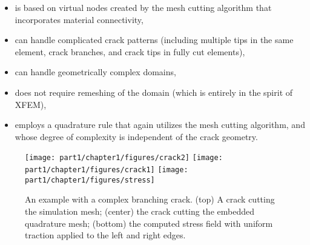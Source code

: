 \begin{itemize}
\item is based on virtual nodes created by the mesh cutting algorithm that incorporates material connectivity,
\item can handle complicated crack patterns (including multiple tips in the same element, crack branches, and crack tips in fully cut elements),
\item can handle geometrically complex domains,
\item does not require remeshing of the domain (which is entirely in the spirit of XFEM),
\item employs a quadrature rule that again utilizes the mesh cutting algorithm, and whose degree of complexity is independent of the crack geometry.
\end{itemize}

\setlength{\figurewidth}{0.79\textwidth}
\begin{figure}[htbp]
\centering
\texttt{[image: part1/chapter1/figures/crack2]}
\texttt{[image: part1/chapter1/figures/crack1]}
\texttt{[image: part1/chapter1/figures/stress]}
\caption{An example with a complex branching crack. (top) A crack cutting the simulation mesh; (center) the crack cutting the embedded quadrature mesh; (bottom) the computed stress field with uniform traction applied to the left and right edges.}
\label{fig:ch1.introexample}
\end{figure}

